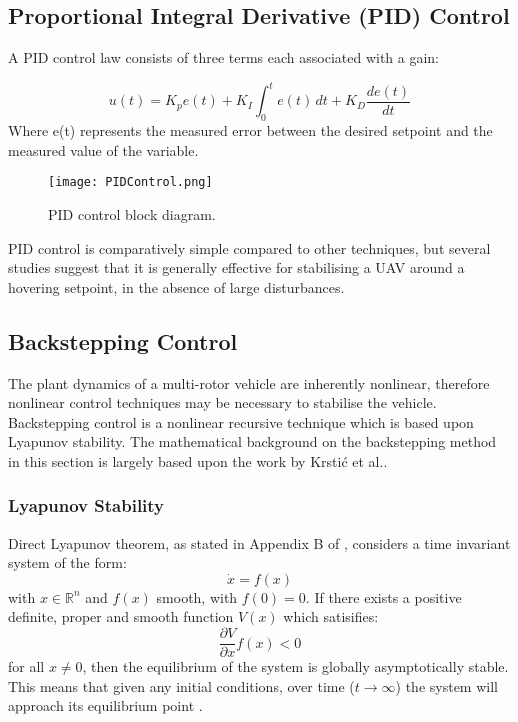 \subsection{Proportional Integral Derivative (PID) Control}\label{section:PIDBackground}
A PID control law consists of three terms each associated with a gain:

\[u(t)=K_{p}e(t)+K_{I}\int_{0}^{t}e(t)\,dt+K_{D}\frac{de(t)}{dt}\]
Where e(t) represents the measured error between the desired setpoint and the measured value of the variable. 

\begin{figure}[htb]
	\texttt{[image: PIDControl.png]}%
	\caption{PID control block diagram.}%
	\label{fig:PIDControl}%
\end{figure}

PID control is comparatively simple compared to other techniques, but several studies suggest that it is generally effective for stabilising a UAV around a hovering setpoint, in the absence of large disturbances\cite{Bouabdallah2006}\cite{Pounds2010}\cite{Moussid2015}. \\

\subsection{Backstepping Control}\label{section:BacksteppingBackground}
The plant dynamics of a multi-rotor vehicle are inherently nonlinear, therefore nonlinear control techniques may be necessary to stabilise the vehicle. Backstepping control is a nonlinear recursive technique which is based upon Lyapunov stability. The mathematical background on the backstepping method in this section is largely based upon the work by Krsti\'c et al.\cite{Krstic1995}.

\subsubsection{Lyapunov Stability}
Direct Lyapunov theorem, as stated in Appendix B of \cite{Isidori1995}, considers a time invariant system of the form:
\[\dot{x}=f(x)\]
with $x\in\mathbb{R}^{n}$ and $f(x)$ smooth, with $f(0)=0$. If there exists a positive definite, proper and smooth function $V(x)$ which satisifies:
\[\frac{\partial V}{\partial x}f(x)<0\]
for all $x\neq0$, then the equilibrium of the system is globally asymptotically stable. This means that given any initial conditions, over time ($t\rightarrow\infty$) the system will approach its equilibrium point \cite{Chen1999}. 

